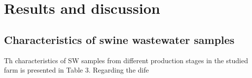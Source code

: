 \section{Results and discussion}
\subsection{Characteristics of swine wastewater samples}
Th characteristics of SW samples from different production stages in the studied farm is presented in Table 3. Regarding the dife